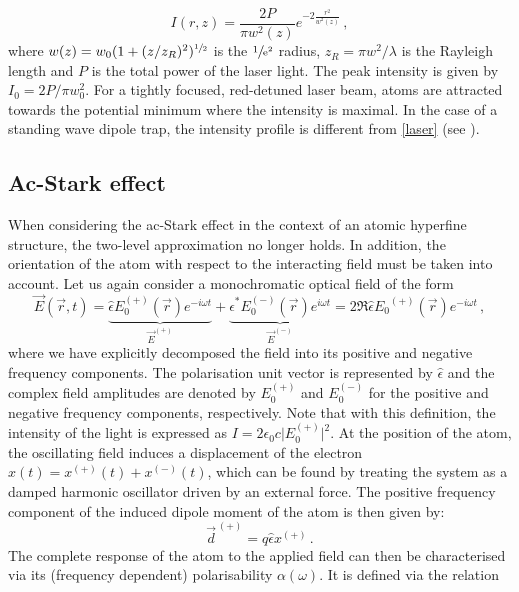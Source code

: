 \documentclass[../Thesis-IJspeert.tex]{subfiles}
\begin{document}
\begin{equation}
\label{laser}
I(r,z)=\frac{2P}{\pi w^2(z)}e^{-2\frac{r^2}{w^2(z)}}\,,
\end{equation}
where $w(z)=w_0(1+(z/z_R)^2)^{\sfrac{1}{2}}$ is the $\sfrac{1}{\mathrm{e}^2}$ radius, $z_R=\pi w^2/\lambda$ is the Rayleigh length and $P$ is the total power of the laser light. The peak intensity is given by $I_0=2P/\pi w_0^2$. For a tightly focused, red-detuned laser beam, atoms are attracted towards the potential minimum where the intensity is maximal. In the case of a standing wave dipole trap, the intensity profile is different from \autoref{laser} (see \cite{Alt2003}).

\subsection{Ac-Stark effect}
\label{acstark}
When considering the ac-Stark effect in the context of an atomic hyperfine structure, the two-level approximation no longer holds. In addition, the orientation of the atom with respect to the interacting field must be taken into account. Let us again consider a monochromatic optical field of the form
\begin{equation}
\label{Efield}
\vec{E}(\vec{r},t) = \underbrace{\hat{\epsilon}E_0^{(+)}(\vec{r}) e^{-i\omega t}}_{\vec{E}^{(+)}} +  \underbrace{\hat{\epsilon}^*E_0^{(-)}(\vec{r}) e^{i\omega t}}_{\vec{E}^{(-)}} =  2\Re {\hat{\epsilon}{E_0}^{(+)}(\vec{r}) e^{-i\omega t} } \,,
\end{equation}
where we have explicitly decomposed the field into its positive and negative frequency components. The polarisation unit vector is represented by $\hat{\epsilon}$ and the complex field amplitudes are denoted by $E_0^{(+)}$ and $E_0^{(-)}$ for the positive and negative frequency components, respectively. Note that with this definition, the intensity of the light is expressed as $I=2\epsilon_0 c \vert E_0^{(+)}\vert ^2$. At the position of the atom, the oscillating field induces a displacement of the electron $x(t)=x^{(+)}(t)+x^{(-)}(t)$, which can be found by treating the system as a damped harmonic oscillator driven by an external force. The positive frequency component of the induced dipole moment of the atom is then given by:
\begin{equation}
\label{dipolemoment}
\vec{d}^{\,(+)}= q \hat{\epsilon} x^{(+)} \,.
\end{equation}
The complete response of the atom to the applied field can then be characterised via its (frequency dependent) polarisability $\alpha (\omega)$. It is defined via the relation
\end{document}
